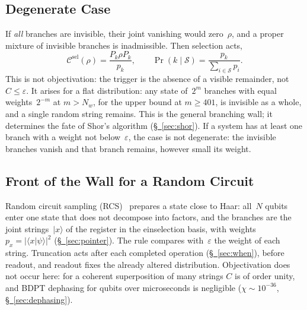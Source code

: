\documentclass[11pt,a4paper]{article}
\newcommand{\Sinv}{\mathcal{S}}
\begin{document}
\subsection{Degenerate Case}
\label{sec:degenerate}

If \emph{all} branches are invisible, their joint vanishing would zero~$\rho$, and a proper mixture of invisible branches is inadmissible. Then selection acts,
\begin{equation}
\mathcal C^{\mathrm{sel}}(\rho)
=\frac{P_k\rho P_k}{p_k},
\qquad
\Pr(k\mid \Sinv)=\frac{p_k}{\sum_{i\in \Sinv}p_i}.
\end{equation}
This is not objectivation: the trigger is the absence of a visible remainder, not~$C\le\varepsilon$. It arises for a flat distribution: any state of~$2^m$ branches with equal weights~$2^{-m}$ at $m>N_w$, for the upper bound at $m\ge401$, is invisible as a whole, and a single random string remains. This is the general branching wall; it determines the fate of Shor's algorithm (\hyperref[sec:shor]{\S~\ref*{sec:shor}}). If a system has at least one branch with a weight not below~$\varepsilon$, the case is not degenerate: the invisible branches vanish and that branch remains, however small its weight.

\subsection{Front of the Wall for a Random Circuit}
\label{sec:pruning}

Random circuit sampling (RCS)~\cite{boixo2018,arute2019} prepares a state close to Haar: all~$N$ qubits enter one state that does not decompose into factors, and the branches are the joint strings~$|x\rangle$ of the register in the einselection basis, with weights $p_x=|\langle x|\psi\rangle|^2$ (\hyperref[sec:pointer]{\S~\ref*{sec:pointer}}). The rule compares with~$\varepsilon$ the weight of each string. Truncation acts after each completed operation (\hyperref[sec:when]{\S~\ref*{sec:when}}), before readout, and readout fixes the already altered distribution. Objectivation does not occur here: for a coherent superposition of many strings $C$ is of order unity, and BDPT dephasing for qubits over microseconds is negligible ($\chi\sim10^{-36}$, \hyperref[sec:dephasing]{\S~\ref*{sec:dephasing}}).
\end{document}
